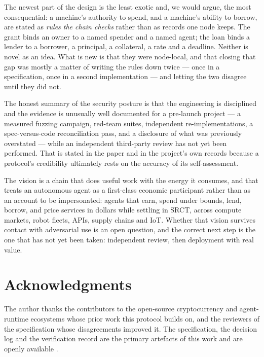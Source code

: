 \documentclass{article}
\begin{document}
The newest part of the design is the least exotic and, we would argue, the most
consequential: a machine's authority to spend, and a machine's ability to
borrow, are stated as \emph{rules the chain checks} rather than as records one
node keeps. The grant binds an owner to a named spender and a named agent; the
loan binds a lender to a borrower, a principal, a collateral, a rate and a
deadline. Neither is novel as an idea. What is new is that they were
node-local, and that closing that gap was mostly a matter of writing the rules
down twice --- once in a specification, once in a second implementation --- and
letting the two disagree until they did not.

The honest summary of the security posture is that the engineering is
disciplined and the evidence is unusually well documented for a pre-launch
project --- a measured fuzzing campaign, red-team suites, independent
re-implementations, a spec-versus-code reconciliation pass, and a
disclosure of what was previously overstated --- while an independent
third-party review has not yet been performed. That is stated in the paper and
in the project's own records because a protocol's credibility ultimately rests
on the accuracy of its self-assessment.

The vision is a chain that does useful work with the energy it consumes, and
that treats an autonomous agent as a first-class economic participant rather
than as an account to be impersonated: agents that earn, spend under bounds,
lend, borrow, and price services in dollars while settling in SRCT, across
compute markets, robot fleets, APIs, supply chains and IoT. Whether that vision
survives contact with adversarial use is an open question, and the correct next
step is the one that has not yet been taken: independent review, then
deployment with real value.


\section*{Acknowledgments}
The author thanks the contributors to the open-source cryptocurrency and
agent-runtime ecosystems whose prior work this protocol builds on, and the
reviewers of the specification whose disagreements improved it. The
specification, the decision log and the verification record are the primary
artefacts of this work and are openly available
\cite{srct-spec,srct-decisions,srct-status,srct-readiness,srct-monetary,
srct-fuzz}.




\end{document}
